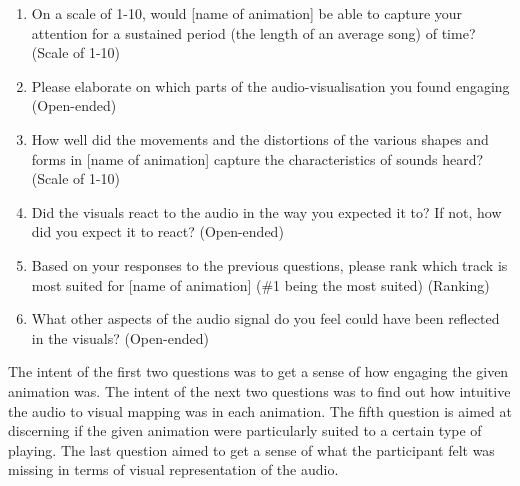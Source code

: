 \documentclass[../initial_thesis.tex]{subfiles}
\begin{document}
\begin{enumerate}
\item {On a scale of 1-10, would [name of animation] be able to capture your attention for a sustained period (the length of an average song) of time? (Scale of 1-10)}
\item {Please elaborate on which parts of the audio-visualisation you found engaging (Open-ended)}
\item {How well did the movements and the distortions of the various shapes and forms in [name of animation] capture the characteristics of sounds heard? (Scale of 1-10)}
\item {Did the visuals react to the audio in the way you expected it to? If not, how did you expect it to react? (Open-ended)}
\item {Based on your responses to the previous questions, please rank which track is most suited for [name of animation] (\#1 being the most suited) (Ranking)}
\item {What other aspects of the audio signal do you feel could have been reflected in the visuals? (Open-ended)}
\end{enumerate}

The intent of the first two questions was to get a sense of how engaging the given animation was. The intent of the next two questions was to find out how intuitive the audio to visual mapping was in each animation. The fifth question is aimed at discerning if the given animation were particularly suited to a certain type of playing. The last question aimed to get a sense of what the participant felt was missing in terms of visual representation of the audio.
\end{document}
